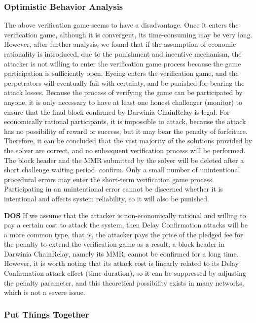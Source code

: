 \subsubsection*{Optimistic Behavior Analysis}

The above verification game seems to have a disadvantage. Once it enters the verification game, although it is convergent, its time-consuming may be very long. However, after further analysis, we found that if the assumption of economic rationality is introduced, due to the punishment and incentive mechanism, the attacker is not willing to enter the verification game process because the game participation is sufficiently open. Eyeing enters the verification game, and the perpetrators will eventually fail with certainty, and be punished for bearing the attack losses. Because the process of verifying the game can be participated by anyone, it is only necessary to have at least one honest challenger (monitor) to ensure that the final block confirmed by Darwinia ChainRelay is legal. For economically rational participants, it is impossible to attack, because the attack has no possibility of reward or success, but it may bear the penalty of forfeiture. Therefore, it can be concluded that the vast majority of the solutions provided by the solver are correct, and no subsequent verification process will be performed. The block header and the MMR submitted by the solver will be deleted after a short challenge waiting period. confirm. Only a small number of unintentional procedural errors may enter the short-term verification game process. Participating in an unintentional error cannot be discerned whether it is intentional and affects system reliability, so it will also be punished.

\textbf{DOS} If we assume that the attacker is non-economically rational and willing to pay a certain cost to attack the system, then Delay Confirmation attacks will be a more common type, that is, the attacker pays the price of the pledged fee for the penalty to extend the verification game as a result, a block header in Darwinia ChainRelay, namely its MMR, cannot be confirmed for a long time. However, it is worth noting that its attack cost is linearly related to its Delay Confirmation attack effect (time duration), so it can be suppressed by adjusting the penalty parameter, and this theoretical possibility exists in many networks, which is not a severe issue.

\subsubsection*{Put Things Together}


